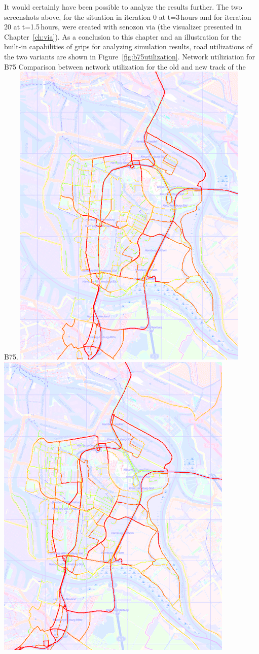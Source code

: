 It would certainly have been possible to analyze the results further. The two screenshots above, for the situation in iteration 0 at t=3\,hours and for iteration 20 at t=1.5\,hours, were created with \gls{senozon} \gls{via} (the visualizer presented in Chapter~\ref{ch:via}). As a conclusion to this chapter and an illustration for the built-in capabilities of \gls{grips} for analyzing simulation results, road utilizations of the two variants are shown in Figure~\ref{fig:b75utilization}.
%
\createfigure%
{Network utiliziation for B75}%
{Comparison between network utilization for the old and new track of the B75.}%
{\label{fig:b75utilization}}%
{%
  \createsubfigure%
  {}%
  {\includegraphics[width=.475\linewidth]{scenarios/figures/b75utilizationold}}%
  {}%
  {}%
  \createsubfigure%
  {}%
  {\includegraphics[width=.475\linewidth]{scenarios/figures/b75utilizationnew}}
  {}%
  {}%
}%
  {}%
